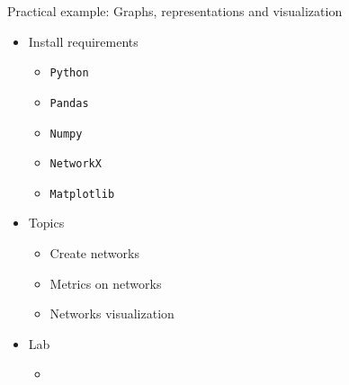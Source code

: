     \begin{frame}{Practical example: Graphs, representations and visualization}
        \begin{itemize}
            \item Install requirements
                \begin{itemize}
                    \item \texttt{Python}
                    \item \texttt{Pandas}
                    \item \texttt{Numpy}
                    \item \texttt{NetworkX}
                    \item \texttt{Matplotlib}
                \end{itemize}
            \item Topics 
                \begin{itemize}
                    \item Create networks
                    \item Metrics on networks
                    \item Networks visualization
                \end{itemize}
            \item Lab
                \begin{itemize}
                    \item              
                        \href{https://drive.google.com/file/d/199QkU5jbJrrg4URuxGU8wGuvIF91y1mo/view?usp=sharing}{
                        }
                \end{itemize}
        \end{itemize}
    \end{frame}


